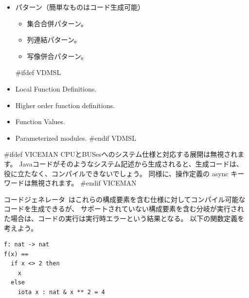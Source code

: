 \documentclass[\pformat,11pt]{jarticle}
\newcommand{\keyw}[1]{{\sf #1}}
\newcommand{\tcg}{コードジェネレータ}
\newcommand{\Tcg}{コードジェネレータ}
\begin{document}
\begin{itemize}
例題として、以下の式が\tcg によりサポートされている。

\begin{screen}
\begin{verbatim}
let x in set numbers in x
\end{verbatim}
\end{screen}

一方で以下はサポートされていない (型束縛 \verb+x : nat+に起因する)。

\begin{screen}
\begin{verbatim}
let x: nat in x
\end{verbatim}
\end{screen}

\item パターン（簡単なものはコード生成可能）

  \begin{itemize}
  \item 集合合併パターン。
  \item 列連結パターン。
  \item 写像併合パターン。
  \end{itemize}

#ifdef VDMSL
\item Local Function Definitions.

\item Higher order function definitions.
  
\item Function Values. 

\item Parameterized modules.
#endif VDMSL
\end{itemize}

#ifdef VICEMAN
CPUとBUSesへのシステム仕様と対応する展開は無視されます。
Javaコードがそのようなシステム記述から生成されると、生成コードは、役に立たなく、コンパイルできないでしょう。
同様に、操作定義の \keyw{async} キーワードは無視されます。
#endif VICEMAN

\Tcg\ はこれらの構成要素を含む仕様に対してコンパイル可能なコードを生成できるが、
サポートされていない構成要素を含む分岐が実行された場合は、コードの実行は実行時エラーという結果となる。
以下の関数定義を考えよう。

\begin{screen}
\begin{verbatim}
f: nat -> nat
f(x) ==
  if x <> 2 then
    x
  else
    iota x : nat & x ** 2 = 4
\end{verbatim}
\end{screen}
\end{document}
